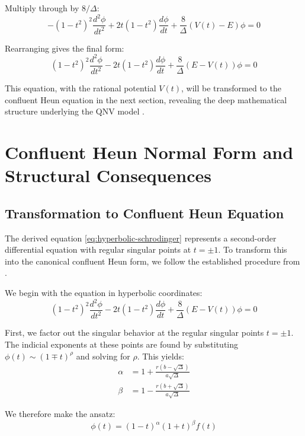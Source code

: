 \documentclass[a4paper,11pt]{article}
\begin{document}
Multiply through by $8/\Delta$:
\begin{equation}
-(1 - t^2)^2\frac{d^2\phi}{dt^2} + 2t(1 - t^2)\frac{d\phi}{dt} + \frac{8}{\Delta}(V(t) - E)\phi = 0
\end{equation}

Rearranging gives the final form:
\begin{equation}
(1 - t^2)^2\frac{d^2\phi}{dt^2} - 2t(1 - t^2)\frac{d\phi}{dt} + \frac{8}{\Delta}(E - V(t))\phi = 0
\label{eq:hyperbolic-schrodinger}
\end{equation}

This equation, with the rational potential $V(t)$, will be transformed to the confluent Heun equation in the next section, revealing the deep mathematical structure underlying the QNV model \cite{Shreve2004,CarrFisherRuf2013}.

\section{Confluent Heun Normal Form and Structural Consequences}

\subsection{Transformation to Confluent Heun Equation}

The derived equation \eqref{eq:hyperbolic-schrodinger} represents a second-order differential equation with regular singular points at $t = \pm 1$. To transform this into the canonical confluent Heun form, we follow the established procedure from \cite{Ronveaux1995,SlavyanovLay2000,Hortacsu2011,Ishkhanyan2024}.

We begin with the equation in hyperbolic coordinates:
\begin{equation}
(1 - t^2)^2\frac{d^2\phi}{dt^2} - 2t(1 - t^2)\frac{d\phi}{dt} + \frac{8}{\Delta}(E - V(t))\phi = 0
\end{equation}

First, we factor out the singular behavior at the regular singular points $t = \pm 1$. The indicial exponents at these points are found by substituting $\phi(t) \sim (1 \mp t)^\rho$ and solving for $\rho$. This yields:
\begin{align}
\alpha &= 1 + \frac{r(b - \sqrt{\Delta})}{a\sqrt{\Delta}} \\
\beta &= 1 - \frac{r(b + \sqrt{\Delta})}{a\sqrt{\Delta}}
\end{align}

We therefore make the ansatz:
\begin{equation}
\phi(t) = (1 - t)^\alpha (1 + t)^\beta f(t)
\label{eq:heun-ansatz}
\end{equation}
\end{document}

